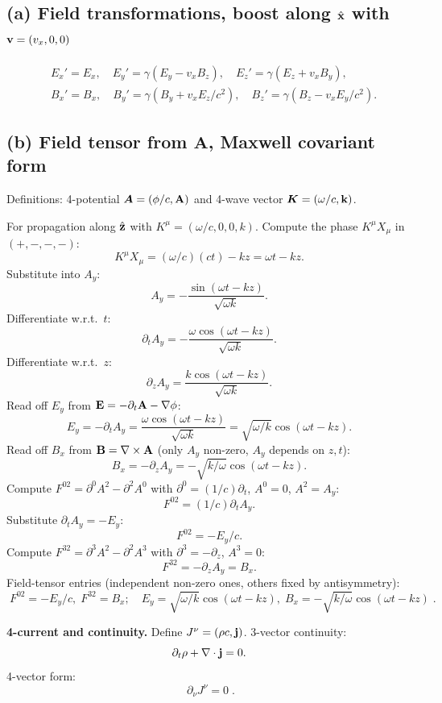 \documentclass[11pt]{article}
\begin{document}
\subsection*{(a) Field transformations, boost along $\hat{\vb x}$ with $\vb v=(v_x,0,0)$}

\[
\boxed{\;
\begin{aligned}
&E_x' = E_x,\quad E_y' = \gamma(E_y - v_x B_z),\quad E_z' = \gamma(E_z + v_x B_y),\\
&B_x' = B_x,\quad B_y' = \gamma(B_y + v_x E_z/c^2),\quad B_z' = \gamma(B_z - v_x E_y/c^2).
\end{aligned}
\;}
\]

\subsection*{(b) Field tensor from $\bm A$, Maxwell covariant form}

Definitions: 4-potential $\bm A = (\phi/c,\vb A)$ and 4-wave vector $\bm K=(\omega/c,\vb k)$.

For propagation along $\hat{\vb z}$ with $K^\mu = (\omega/c,0,0,k)$. Compute the phase $K^\mu X_\mu$ in $(+,-,-,-)$:
\[
K^\mu X_\mu = (\omega/c)(ct) - kz = \omega t - kz.
\]
Substitute into $A_y$:
\[
A_y = -\frac{\sin(\omega t - kz)}{\sqrt{\omega k}}.
\]
Differentiate w.r.t.\ $t$:
\[
\partial_t A_y = -\frac{\omega\cos(\omega t-kz)}{\sqrt{\omega k}}.
\]
Differentiate w.r.t.\ $z$:
\[
\partial_z A_y = \frac{k\cos(\omega t-kz)}{\sqrt{\omega k}}.
\]
Read off $E_y$ from $\vb E = -\partial_t\vb A - \nabla\phi$:
\[
E_y = -\partial_t A_y = \frac{\omega\cos(\omega t-kz)}{\sqrt{\omega k}} = \sqrt{\omega/k}\cos(\omega t-kz).
\]
Read off $B_x$ from $\vb B = \nabla\times\vb A$ (only $A_y$ non-zero, $A_y$ depends on $z,t$):
\[
B_x = -\partial_z A_y = -\sqrt{k/\omega}\cos(\omega t-kz).
\]
Compute $F^{02} = \partial^0 A^2 - \partial^2 A^0$ with $\partial^0=(1/c)\partial_t$, $A^0=0$, $A^2 = A_y$:
\[
F^{02} = (1/c)\partial_t A_y.
\]
Substitute $\partial_t A_y = -E_y$:
\[
F^{02} = -E_y/c.
\]
Compute $F^{32} = \partial^3 A^2 - \partial^2 A^3$ with $\partial^3=-\partial_z$, $A^3=0$:
\[
F^{32} = -\partial_z A_y = B_x.
\]
Field-tensor entries (independent non-zero ones, others fixed by antisymmetry):
\[
\boxed{\;F^{02} = -E_y/c,\;F^{32}=B_x;\quad E_y = \sqrt{\omega/k}\cos(\omega t-kz),\;B_x = -\sqrt{k/\omega}\cos(\omega t-kz)\;}.
\]

\textbf{4-current and continuity.} Define $J^\nu = (\rho c,\vb j)$. 3-vector continuity:
\[
\partial_t\rho + \nabla\cdot\vb j = 0.
\]
4-vector form:
\[
\boxed{\;\partial_\nu J^\nu = 0\;}.
\]
\end{document}
